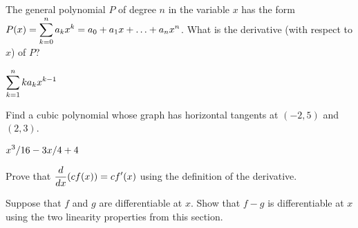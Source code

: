 \begin{exercises}
\exercise The general polynomial $P$ of degree $n$ in the variable $x$
has the form $\displaystyle P(x)= \sum _{k=0 } ^n a_k x^k = a_0 + a_1 x + \ldots
+ a_n x^n$. What is the derivative (with respect to $x$)
of $P$?
\begin{answer} $\displaystyle\sum_{k=1}^n ka_kx^{k-1}$
\end{answer}

\exercise Find a cubic polynomial whose graph has horizontal tangents at
$(-2 , 5)$ and $(2, 3)$.
\begin{answer} $\displaystyle x^3/16-3x/4+4$
\end{answer}
 
\exercise Prove that $\displaystyle{d\over dx}(cf(x))= cf'(x)$ using the
definition of the derivative.

\exercise Suppose that $f$ and $g$ are differentiable at $x$. Show
that $f-g$ is differentiable at $x$ using the two linearity
properties from this section.

\end{exercises}


